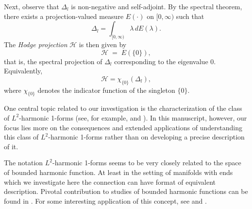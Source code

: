 \documentclass[12pt]{amsart}
\begin{document}
\medskip
Next, observe that $\Delta_l$ is non-negative and self-adjoint. By the spectral theorem, there exists a projection-valued measure $E(\cdot)$ on $[0,\infty)$ such that
\[
    \Delta_l = \int_{[0,\infty)} \lambda \, dE(\lambda).
\]
The \emph{Hodge projection} $\mathcal{H}$ is then given by
\[
    \mathcal{H} \;=\; E(\{0\}),
\]
that is, the spectral projection of $\Delta_l$ corresponding to the eigenvalue $0$. Equivalently,
\[
    \mathcal{H} = \chi_{\{0\}}(\Delta_l),
\]
where $\chi_{\{0\}}$ denotes the indicator function of the singleton $\{0\}$.







One central topic related to our investigation is the characterization of the class of 
\(L^2\)-harmonic 1-forms (see, for example, \cite{Carron-noncompact} and \cite{GW}). 
In this manuscript, however, our focus lies more on the consequences and extended applications 
of understanding this class of \(L^2\)-harmonic 1-forms rather than on developing a precise 
description of it.


The notation \( L^2 \)-harmonic 1-forms seems to be very closely related to the space of bounded harmonic function. At least in the setting of manifolds with ends which we investigate here the connection can have format of equivalent description. Pivotal contribution to studies of bounded harmonic functions can be found in \cite{Li, LiWa}. For some interesting application of this concept, see \cite{DY} and \cite{presik}.





\end{document}
